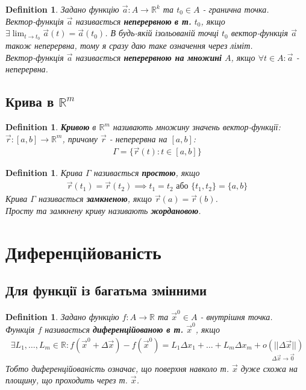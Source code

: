 \documentclass[a4paper, 10pt]{article}
\def\huge{\displaystyle}
\theoremstyle{theoremdd}
\theoremstyle{theoremdd}
\newtheorem{definition}[theorem]{Definition}
\theoremstyle{theoremdd}
\theoremstyle{theoremdd}
\theoremstyle{theoremdd}
\theoremstyle{theoremdd}
\theoremstyle{theoremdd}
\theoremstyle{theoremdd}
\begin{document}
\begin{definition}
Задано функцію $\vec{a}: A \to \mathbb{R}^k$ та $t_0 \in A$ - гранична точка.\\
Вектор-функція $\vec{a}$ називається \textbf{неперервною} \textbf{в т.} $t_0$, якщо $\exists \huge\lim_{t \to t_0} \vec{a}(t) = \vec{a}(t_0)$. В будь-якій ізольованій точці $t_0$ вектор-функція $\vec{a}$ також неперервна, тому я сразу даю таке означення через ліміт.\\
Вектор-функція $\vec{a}$ називається \textbf{неперервною на множині} $A$, якщо $\forall t \in A: \vec{a}$ - неперервна.
\end{definition}

\subsection{Крива в $\mathbb{R}^m$}
\begin{definition}
\textbf{Кривою} в $\mathbb{R}^m$ називають множину значень вектор-функції: $\vec{r}: [a,b] \to \mathbb{R}^m$, причому $\vec{r}$ - неперервна на $[a,b]$:
\begin{align*}
\Gamma = \{ \vec{r}(t): t \in [a,b]\}
\end{align*}
\end{definition}

\begin{definition}
Крива $\Gamma$ називається \textbf{простою}, якщо
\begin{align*}
\vec{r}(t_1) = \vec{r}(t_2) \implies t_1 = t_2 \text{ або } \{t_1,t_2\} = \{a,b\}
\end{align*}
Крива $\Gamma$ називається \textbf{замкненою}, якщо $\vec{r}(a) = \vec{r}(b)$.\\
Просту та замкнену криву називають \textbf{жордановою}.
\end{definition}

\newpage

\section{Диференційованість}
\subsection{Для функції із багатьма змінними}
\begin{definition}
Задано функцію $f: A \to \mathbb{R}$ та $\vec{x}^0 \in A$ - внутрішня точка.\\
Функція $f$ називається \textbf{диференційованою в т.} $\vec{x}^0$, якщо
\begin{align*}
\exists L_1,\dots, L_m \in \mathbb{R}: f(\vec{x}^0 + \Delta \vec{x}) - f(\vec{x}^0) = L_1 \Delta x_1 + \dots + L_m \Delta x_m + \underset{\Delta \vec{x} \to \vec{0}}{o(||\Delta \vec{x}||)}
\end{align*}
Тобто диференційованість означає, що поверхня навколо т. $\vec{x}$ дуже схожа на площину, що проходить через т. $\vec{x}$.
\end{definition}
\end{document}

